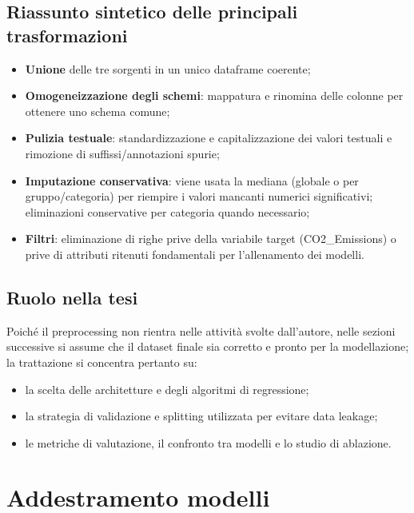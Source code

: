 \documentclass[a4paper,12pt]{report}
\begin{document}
	\subsection{Riassunto sintetico delle principali trasformazioni}
	\begin{itemize}
		\item \textbf{Unione} delle tre sorgenti in un unico dataframe coerente;
		\item \textbf{Omogeneizzazione degli schemi}: mappatura e rinomina delle colonne per ottenere uno schema comune;
		\item \textbf{Pulizia testuale}: standardizzazione e capitalizzazione dei valori testuali e rimozione di suffissi/annotazioni spurie;
		\item \textbf{Imputazione conservativa}: viene usata la mediana (globale o per gruppo/categoria) per riempire i valori mancanti numerici significativi; eliminazioni conservative per categoria quando necessario;
		\item \textbf{Filtri}: eliminazione di righe prive della variabile target (CO2\_Emissions) o prive di attributi ritenuti fondamentali per l'allenamento dei modelli.
	\end{itemize}
	
	\subsection{Ruolo nella tesi}
	Poiché il preprocessing non rientra nelle attività svolte dall'autore, nelle sezioni successive si assume che il dataset finale sia corretto e pronto per la modellazione; la trattazione si concentra pertanto su:
	\begin{itemize}
		\item la scelta delle architetture e degli algoritmi di regressione;
		\item la strategia di validazione e splitting utilizzata per evitare data leakage;
		\item le metriche di valutazione, il confronto tra modelli e lo studio di ablazione.
	\end{itemize}
	
	\section{Addestramento modelli}
	
\end{document}
